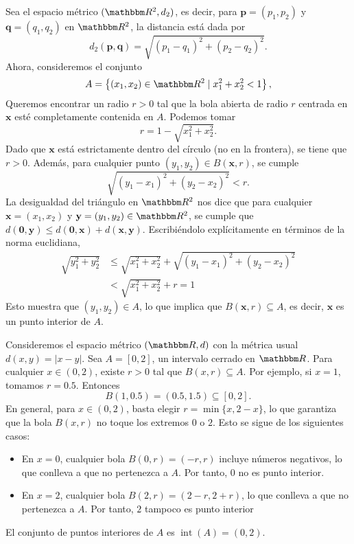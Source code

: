 \begin{examplebox}{}{}
    Sea el espacio métrico $(\RR[2], d_2)$, es decir, para $\mathbf{p} = (p_1, p_2)$ y $\mathbf{q} = (q_1, q_2)$ en $\RR[2]$, la distancia está dada por
    $$d_2(\mathbf{p}, \mathbf{q}) = \sqrt{(p_1 - q_1)^2 + (p_2 - q_2)^2}.$$
    Ahora, consideremos el conjunto
    $$A = \left\{(x_1, x_2) \in \RR[2] \mid x_1^2 + x_2^2 < 1\right\},$$
    Queremos encontrar un radio $r > 0$ tal que la bola abierta de radio $r$ centrada en $\mathbf{x}$ esté completamente contenida en $A$. Podemos tomar
    $$r = 1 - \sqrt{x_1^2 + x_2^2}.$$
    Dado que $\mathbf{x}$ está estrictamente dentro del círculo (no en la frontera), se tiene que $r > 0$. Además, para cualquier punto $(y_1, y_2) \in B(\mathbf{x}, r)$, se cumple
    $$\sqrt{(y_1 - x_1)^2 + (y_2 - x_2)^2} < r.$$
    La desigualdad del triángulo en $\RR[2]$ nos dice que para cualquier $\mathbf{x} = (x_1, x_2)$ y $\mathbf{y} = (y_1, y_2) \in \RR[2]$, se cumple que $d( \mathbf{0}, \mathbf{y} ) \leq d( \mathbf{0}, \mathbf{x} ) + d( \mathbf{x}, \mathbf{y} )$. Escribiéndolo explícitamente en términos de la norma euclidiana,
    \begin{align*}
        \sqrt{y_1^2 + y_2^2} & \leq \sqrt{x_1^2 + x_2^2} + \sqrt{(y_1 - x_1)^2 + (y_2 - x_2)^2} \\
        & < \sqrt{x_1^2 + x_2^2} + r = 1
    \end{align*}
    Esto muestra que $(y_1, y_2) \in A$, lo que implica que $B(\mathbf{x}, r) \subseteq A$, es decir, $\mathbf{x}$ es un punto interior de $A$.
\end{examplebox}

\newpage

\begin{examplebox}{}{}
    Consideremos el espacio métrico $(\RR, d)$ con la métrica usual $d(x, y) = |x - y|$. Sea $A = [0, 2]$, un intervalo cerrado en $\RR$. Para cualquier $x \in (0, 2)$, existe $r > 0$ tal que $B(x, r) \subseteq A$. Por ejemplo, si $x = 1$, tomamos $r = 0.5$. Entonces
    $$B(1, 0.5) = (0.5, 1.5) \subseteq [0, 2].$$
    En general, para $x \in (0, 2)$, basta elegir $r = \min \{x, 2 - x\}$, lo que garantiza que la bola $B(x, r)$ no toque los extremos $0$ o $2$. Esto se sigue de los siguientes casos:
    \begin{itemize}[topsep=6pt, itemsep=0pt]
        \item En $x = 0$, cualquier bola $B(0, r) = (-r, r)$ incluye números negativos, lo que conlleva a que no pertenezca a $A$. Por tanto, $0$ no es punto interior.
        \item En $x = 2$, cualquier bola $B(2, r) = (2 - r, 2 + r)$, lo que conlleva a que no pertenezca a $A$. Por tanto, $2$ tampoco es punto interior
    \end{itemize}
    El conjunto de puntos interiores de $A$ es $\operatorname{int}(A) = (0, 2)$.
\end{examplebox}

